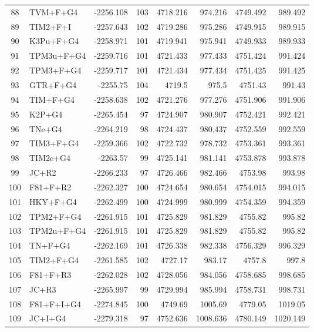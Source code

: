 \begin{longtable}{clrrrrrr}
	88 & TVM+F+G4 & -2256.108 & 103 & 4718.216 & 974.216 & 4749.492 & 989.492 \\ 
	89 & TIM2+F+I & -2257.643 & 102 & 4719.286 & 975.286 & 4749.915 & 989.915 \\ 
	90 & K3Pu+F+G4 & -2258.971 & 101 & 4719.941 & 975.941 & 4749.933 & 989.933 \\ 
	91 & TPM3u+F+G4 & -2259.716 & 101 & 4721.433 & 977.433 & 4751.424 & 991.424 \\ 
	92 & TPM3+F+G4 & -2259.717 & 101 & 4721.434 & 977.434 & 4751.425 & 991.425 \\ 
	93 & GTR+F+G4 & -2255.75 & 104 & 4719.5 & 975.5 & 4751.43 & 991.43 \\ 
	94 & TIM+F+G4 & -2258.638 & 102 & 4721.276 & 977.276 & 4751.906 & 991.906 \\ 
	95 & K2P+G4 & -2265.454 & 97 & 4724.907 & 980.907 & 4752.421 & 992.421 \\ 
	96 & TNe+G4 & -2264.219 & 98 & 4724.437 & 980.437 & 4752.559 & 992.559 \\ 
	97 & TIM3+F+G4 & -2259.366 & 102 & 4722.732 & 978.732 & 4753.361 & 993.361 \\ 
	98 & TIM2e+G4 & -2263.57 & 99 & 4725.141 & 981.141 & 4753.878 & 993.878 \\ 
	99 & JC+R2 & -2266.233 & 97 & 4726.466 & 982.466 & 4753.98 & 993.98 \\ 
	100 & F81+F+R2 & -2262.327 & 100 & 4724.654 & 980.654 & 4754.015 & 994.015 \\ 
	101 & HKY+F+G4 & -2262.499 & 100 & 4724.999 & 980.999 & 4754.359 & 994.359 \\ 
	102 & TPM2+F+G4 & -2261.915 & 101 & 4725.829 & 981.829 & 4755.82 & 995.82 \\ 
	103 & TPM2u+F+G4 & -2261.915 & 101 & 4725.829 & 981.829 & 4755.82 & 995.82 \\ 
	104 & TN+F+G4 & -2262.169 & 101 & 4726.338 & 982.338 & 4756.329 & 996.329 \\ 
	105 & TIM2+F+G4 & -2261.585 & 102 & 4727.17 & 983.17 & 4757.8 & 997.8 \\ 
	106 & F81+F+R3 & -2262.028 & 102 & 4728.056 & 984.056 & 4758.685 & 998.685 \\ 
	107 & JC+R3 & -2265.997 & 99 & 4729.994 & 985.994 & 4758.731 & 998.731 \\ 
	108 & F81+F+I+G4 & -2274.845 & 100 & 4749.69 & 1005.69 & 4779.05 & 1019.05 \\ 
	109 & JC+I+G4 & -2279.318 & 97 & 4752.636 & 1008.636 & 4780.149 & 1020.149 \\ 

\end{longtable}
